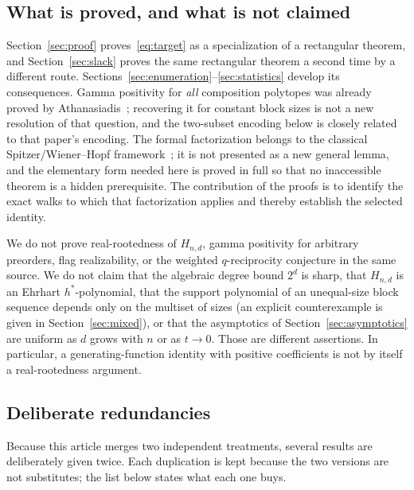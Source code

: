 \documentclass[11pt]{article}
\numberwithin{equation}{section}
\theoremstyle{definition}
\begin{document}
\subsection{What is proved, and what is not claimed}
Section~\ref{sec:proof} proves~\eqref{eq:target} as a specialization of a
rectangular theorem, and Section~\ref{sec:slack} proves the same rectangular
theorem a second time by a different route.
Sections~\ref{sec:enumeration}--\ref{sec:statistics} develop its consequences.
Gamma positivity for \emph{all} composition polytopes was already proved by
Athanasiadis~\cite[Theorem~1.2]{A}; recovering it for constant block sizes is
not a new resolution of that question, and the two-subset encoding below is
closely related to that paper's encoding. The formal factorization belongs to
the classical Spitzer/Wiener--Hopf framework~\cite{Spitzer,BF}; it is not
presented as a new general lemma, and the elementary form needed here is
proved in full so that no inaccessible theorem is a hidden prerequisite. The
contribution of the proofs is to identify the exact walks to which that
factorization applies and thereby establish the selected identity.

We do not prove real-rootedness of $H_{n,d}$, gamma positivity for arbitrary
preorders, flag realizability, or the weighted $q$-reciprocity conjecture in
the same source. We do not claim that the algebraic degree bound $2^d$ is
sharp, that $H_{n,d}$ is an Ehrhart $h^*$-polynomial, that the support
polynomial of an unequal-size block sequence depends only on the multiset of
sizes (an explicit counterexample is given in
Section~\ref{sec:mixed}), or that the asymptotics of
Section~\ref{sec:asymptotics} are uniform as $d$ grows with $n$ or as
$t\to0$. Those are different assertions. In particular, a generating-function
identity with positive coefficients is not by itself a real-rootedness
argument.

\subsection{Deliberate redundancies}
\label{sec:redundancies}
Because this article merges two independent treatments, several results are
deliberately given twice. Each duplication is kept because the two versions
are not substitutes; the list below states what each one buys.
\end{document}
